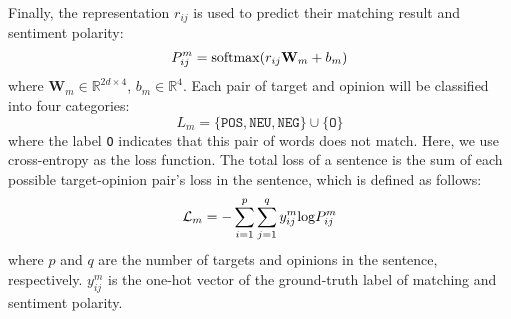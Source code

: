 \documentclass[11pt]{article}
\begin{document}
Finally, the representation $r_{ij}$ is used to predict their matching result and sentiment polarity:
\begin{equation}
    P^m_{ij} = {\rm softmax}(r_{ij}\textbf{W}_m+b_m)
\end{equation}
where $\textbf{W}_m \in \mathbb{R}^{2d\times 4}$, $b_m \in \mathbb{R}^{4}$. Each pair of target and opinion will be classified into four categories:
\begin{equation}
    L_m=\{\texttt{POS},\texttt{NEU}, \texttt{NEG}\} \cup \{\texttt{O}\}
\end{equation}
where the label \texttt{O} indicates that this pair of words does not match.
Here, we use cross-entropy as the loss function. The total loss of a sentence is the sum of each possible target-opinion pair's loss in the sentence, which is defined as follows:
\begin{equation}
    \mathcal{L}_m = -\sum_{i=1}^p \sum_{j=1}^q y^m_{ij}{\rm log}P^m_{ij}
\end{equation}
where $p$ and $q$ are the number of targets and opinions in the sentence, respectively. $y^m_{ij}$ is the one-hot vector of the ground-truth label of matching and sentiment polarity.
\end{document}
